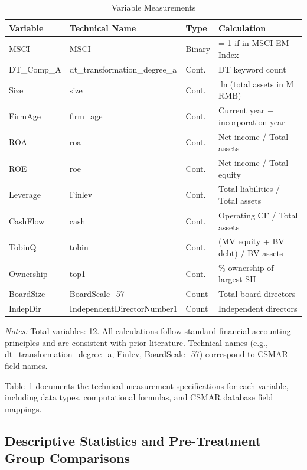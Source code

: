 \begin{table}[htbp]
\centering
\caption{Variable Measurements}
\label{tab:variable_measurements}
\small
\begin{tabular}{llll}
\toprule
\textbf{Variable} & \textbf{Technical Name} & \textbf{Type} & \textbf{Calculation} \\
\midrule
MSCI & MSCI & Binary & = 1 if in MSCI EM Index \\
DT\_Comp\_A & dt\_transformation\_degree\_a & Cont. & DT keyword count \\
Size & size & Cont. & $\ln$(total assets in M RMB) \\
FirmAge & firm\_age & Cont. & Current year $-$ incorporation year \\
ROA & roa & Cont. & Net income / Total assets \\
ROE & roe & Cont. & Net income / Total equity \\
Leverage & Finlev & Cont. & Total liabilities / Total assets \\
CashFlow & cash & Cont. & Operating CF / Total assets \\
TobinQ & tobin & Cont. & (MV equity + BV debt) / BV assets \\
Ownership & top1 & Cont. & \% ownership of largest SH \\
BoardSize & BoardScale\_57 & Count & Total board directors \\
IndepDir & IndependentDirectorNumber1 & Count & Independent directors \\
\bottomrule
\end{tabular}
\begin{tablenotes}
\small
\item \textit{Notes:} Total variables: 12. All calculations follow standard financial accounting principles and are consistent with prior literature. Technical names (e.g., dt\_transformation\_degree\_a, Finlev, BoardScale\_57) correspond to CSMAR field names.
\end{tablenotes}
\end{table}

Table~\ref{tab:variable_measurements} documents the technical measurement specifications for each variable, including data types, computational formulas, and CSMAR database field mappings.

\subsection{Descriptive Statistics and Pre-Treatment Group Comparisons}

